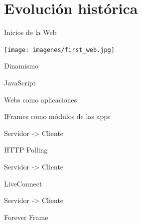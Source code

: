 \documentclass[usenames,dvipsnames]{beamer}
\begin{document}
\section{Evolución histórica}

\begin{frame}{Inicios de la Web}

	\begin{center}
	\texttt{[image: imagenes/first\_web.jpg]}
	\end{center}
	
\end{frame}

\begin{frame}{Dinamismo}

	\begin{center}
	\huge{JavaScript}
	\end{center}
	
\end{frame}

\begin{frame}{Webs como aplicaciones}

	\begin{center}
	\huge{IFrames como módulos de las apps}
	\end{center}
	
\end{frame}


\begin{frame}{Servidor -> Cliente}

	\begin{center}
	\huge{HTTP Polling}
	\end{center}
	
\end{frame}

\begin{frame}{Servidor -> Cliente}

	\begin{center}
	\huge{LiveConnect}
	\end{center}
	
\end{frame}


\begin{frame}{Servidor -> Cliente}

	\begin{center}
	\huge{Forever Frame}
	\end{center}
	
\end{frame}
\end{document}

